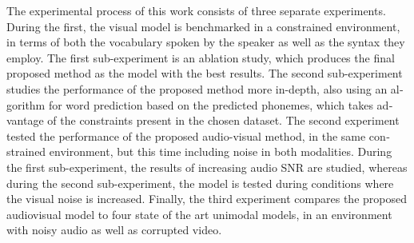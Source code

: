 \begin{english}
The experimental process of this work consists of three separate experiments. During the first, the visual model is benchmarked in a constrained environment, in terms of both the vocabulary spoken by the speaker as well as the syntax they employ. The first sub-experiment is an ablation study, which produces the final proposed method as the model with the best results. The second sub-experiment studies the performance of the proposed method more in-depth, also using an algorithm for word prediction based on the predicted phonemes, which takes advantage of the constraints present in the chosen dataset. The second experiment tested the performance of the proposed audio-visual method, in the same constrained environment, but this time including noise in both modalities. During the first sub-experiment, the results of increasing audio SNR are studied, whereas during the second sub-experiment, the model is tested during conditions where the visual noise is increased. Finally, the third experiment compares the proposed audiovisual model to four state of the art unimodal models, in an environment with noisy audio as well as corrupted video. 

\vspace*{\fill}
\end{english}
